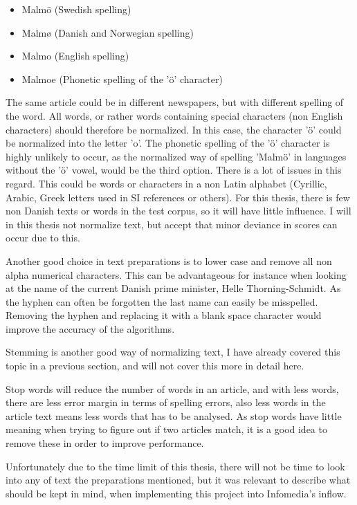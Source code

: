 \begin{itemize}
\item Malmö (Swedish spelling)
\item Malmø (Danish and Norwegian spelling)
\item Malmo (English spelling)
\item Malmoe (Phonetic spelling of the 'ö' character)
\end{itemize}

The same article could be in different newspapers, but with different spelling of the word. All words, or rather words containing special characters (non English characters) should therefore be normalized. In this case, the character 'ö' could be normalized into the letter 'o'. The phonetic spelling of the 'ö' character is highly unlikely to occur, as the normalized way of spelling 'Malmö' in languages without the 'ö' vowel, would be the third option. There is a lot of issues in this regard. This could be words or characters in a non Latin alphabet (Cyrillic, Arabic, Greek letters used in SI references or others). For this thesis, there is few non Danish texts or words in the test corpus, so it will have little influence. I will in this thesis not normalize text, but accept that minor deviance in scores can occur due to this.

Another good choice in text preparations is to lower case and remove all non alpha numerical characters. This can be advantageous for instance when looking at the name of the current Danish prime minister, Helle Thorning-Schmidt. As the hyphen can often be forgotten the last name can easily be misspelled. Removing the hyphen and replacing it with a blank space character would improve the accuracy of the algorithms. 

Stemming is another good way of normalizing text, I have already covered this topic in a previous section, and will not cover this more in detail here. 

Stop words will reduce the number of words in an article, and with less words, there are less error margin in terms of spelling errors, also less words in the article text means less words that has to be analysed. As stop words have little meaning when trying to figure out if two articles match, it is a good idea to remove these in order to improve performance. 

Unfortunately due to the time limit of this thesis, there will not be time to look into any of text the preparations mentioned, but it was relevant to describe what should be kept in mind, when implementing this project into Infomedia's inflow.

